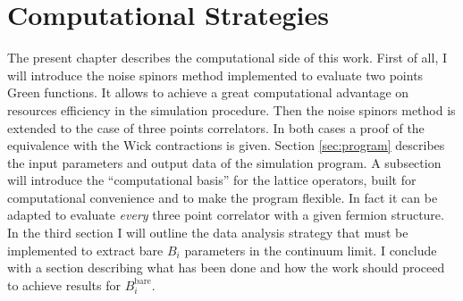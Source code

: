 \documentclass[english, LaM, oneside, noexaminfo]{sapthesis}
\newcommand{\bare}{^{\text{bare}}}
\begin{document}
\chapter{Computational Strategies}
\lettrine[lines=2, findent=3pt, nindent=0pt]{T}{}he present chapter describes the computational side of this work.
First of all, I will introduce the noise spinors method implemented to evaluate two points Green functions.
It allows to achieve a great computational advantage on resources efficiency in the simulation procedure.
Then the noise spinors method is extended to the case of three points correlators.
In both cases a proof of the equivalence with the Wick contractions is given.
Section \ref{sec:program} describes the input parameters and output data of the simulation program.
A subsection will introduce the ``computational basis'' for the lattice operators, built for computational convenience and to make the program flexible.
In fact it can be adapted to evaluate {\it every} three point correlator with a given fermion structure.
In the third section I will outline the data analysis strategy that must be implemented to extract bare $B_i$ parameters in the continuum limit.
I conclude with a section describing what has been done and how the work should proceed to achieve results for $B_i\bare$.
\end{document}
